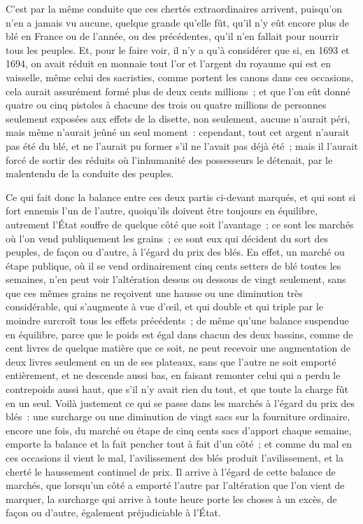 \documentclass[french,twoside]{book} %
\begin{document}
C’est par la même conduite que ces chertés extraordinaires arrivent, puisqu’on n’en a jamais vu aucune, quelque grande qu’elle fût, qu’il n’y eût encore plus de blé en France ou de l’année, ou des précédentes, qu’il n’en fallait pour nourrir tous les peuples. Et, pour le faire voir, il n’y a qu’à considérer que si, en 1693 et 1694, on avait réduit en monnaie tout l’or et l’argent du royaume qui est en vaisselle, même celui des sacristies, comme portent les canons dans ces occasions, cela aurait assurément formé plus de deux cents millions ; et que l’on eût donné quatre ou cinq pistoles à chacune des trois ou quatre millions de personnes seulement exposées aux effets de la disette, non seulement, aucune n’aurait péri, mais même n’aurait jeûné un seul moment : cependant, tout cet argent n’aurait pas été du blé, et ne l’aurait pu former s’il ne l’avait pas déjà été ; mais il l’aurait forcé de sortir des réduits où l’inhumanité des possesseurs le détenait, par le malentendu de la conduite des peuples.\par
Ce qui fait donc la balance entre ces deux partis ci-devant marqués, et qui sont si fort ennemis l’un de l’autre, quoiqu’ils doivent être toujours en équilibre, autrement l’État souffre de quelque côté que soit l’avantage ; ce sont les marchés où l’on vend publiquement les grains ; ce sont eux qui décident du sort des peuples, de façon ou d’autre, à l’égard du prix des blés. En effet, un marché ou étape publique, où il se vend ordinairement cinq cents setters de blé toutes les semaines, n’en peut voir l’altération dessus ou dessous de vingt seulement, sans que ces mêmes grains ne reçoivent une hausse ou une diminution très considérable, qui s’augmente à vue d’œil, et qui double et qui triple par le moindre surcroît tous les effets précédents ; de même qu’une balance suspendue en équilibre, parce que le poids est égal dans chacun des deux bassins, comme de cent livres de quelque matière que ce soit, ne peut recevoir une augmentation de deux livres seulement en un de ses plateaux, sans que l’autre ne soit emporté entièrement, et ne descende aussi bas, en faisant remonter celui qui a perdu le contrepoids aussi haut, que s’il n’y avait rien du tout, et que toute la charge fût en un seul. Voilà justement ce qui se passe dans les marchés à l’égard du prix des blés : une surcharge ou une diminution de vingt sacs sur la fourniture ordinaire, encore une fois, du marché ou étape de cinq cents sacs d’apport chaque semaine, emporte la balance et la fait pencher tout à fait d’un côté ; et comme du mal en ces occasions il vient le mal, l’avilissement des blés produit l’avilissement, et la cherté le haussement continuel de prix. Il arrive à l’égard de cette balance de marchés, que lorsqu’un côté a emporté l’autre par l’altération que l’on vient de marquer, la surcharge qui arrive à toute heure porte les choses à un excès, de façon ou d’autre, également préjudiciable à l’État.\par
\end{document}
